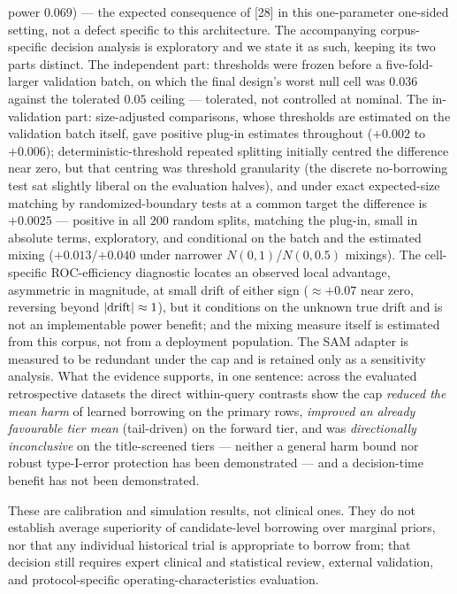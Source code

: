 \documentclass[11pt]{article}
\begin{document}
power $0.069$) --- the expected consequence of [28] in this one-parameter
one-sided setting, not a defect specific to this architecture. The
accompanying corpus-specific decision analysis is exploratory and we state
it as such, keeping its two parts distinct. The independent part:
thresholds were frozen before a five-fold-larger validation batch, on
which the final design's worst null cell was $0.036$ against the
tolerated $0.05$ ceiling --- tolerated, not controlled at nominal. The
in-validation part: size-adjusted comparisons, whose thresholds are
estimated on the validation batch itself, gave positive plug-in
estimates
throughout ($+0.002$ to $+0.006$); deterministic-threshold repeated
splitting initially centred the difference near zero, but that centring
was threshold granularity (the discrete no-borrowing test sat slightly
liberal on the evaluation halves), and under exact expected-size
matching by randomized-boundary tests at a common target the difference
is $+0.0025$ --- positive in all $200$ random splits, matching the
plug-in, small in absolute terms, exploratory, and conditional on the
batch and the estimated mixing ($+0.013$/$+0.040$ under narrower
$N(0,1)$/$N(0,0.5)$ mixings). The cell-specific
ROC-efficiency diagnostic locates an observed local advantage, asymmetric
in magnitude, at small
drift of either sign ($\approx +0.07$ near zero, reversing beyond
$|{\rm drift}| \approx 1$), but it conditions on the unknown true drift
and is not an implementable power benefit; and the mixing measure itself
is estimated from this corpus, not from a
deployment population. The SAM adapter is
measured to be redundant under the cap and is retained only as a
sensitivity analysis. What the evidence supports, in one sentence: across
the evaluated retrospective datasets the direct within-query contrasts
show the cap \emph{reduced the mean harm} of learned borrowing on the
primary rows, \emph{improved an already favourable tier mean}
(tail-driven) on
the forward tier, and was \emph{directionally inconclusive} on the
title-screened tiers --- neither a
general harm bound nor robust type-I-error protection has been
demonstrated --- and a decision-time benefit has not been demonstrated.

These are calibration and simulation results, not clinical ones. They do not
establish average superiority of candidate-level borrowing over marginal
priors, nor that any individual historical trial is appropriate to borrow
from; that decision still requires expert clinical and statistical review,
external validation, and protocol-specific operating-characteristics
evaluation.
\end{document}
